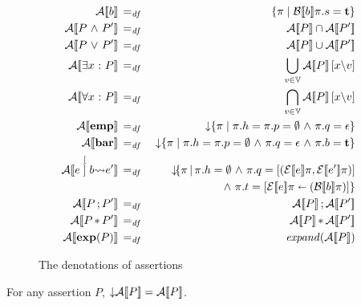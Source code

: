 \documentclass[11pt]{report}
\begin{document}
\begin{figure}[h]
	\centering
		\begin{eqnarray*}
			\dna{b} & \eqdef & \setof{\pi}{\dnbexpr{b}\pi.s = \bvt} \\
			\dna{P \conj P'} & \eqdef & \dna{P} \cap \dna{P'} \\
			\dna{P \disj P'} & \eqdef & \dna{P} \cup \dna{P'} \\
			\dna{\exists x \st P} & \eqdef & \bigcup_{v \in \setvalues}\dna{P}\unsubst{x}{v} \\
			\dna{\forall x \st P} & \eqdef & \bigcap_{v \in \setvalues}\dna{P}\unsubst{x}{v} \\
			\dna{\emp} & \eqdef & \down \setof{\pi}{\pi.h = \pi.p = \nil \conj \pi.q = \epsilon} \\
			\dna{\barr} & \eqdef & \down \setof{\pi}{\pi.h = \pi.p = \nil \conj \pi.q = \epsilon \conj \pi.b = \bvt} \\
			\dna{e \writeto{}{b} e'} & \eqdef & \down \lbrace\pi \,|\, \pi.h = \nil \conj \pi.q = \lsingle{(\dnexpr{e}\pi, \dnexpr{e'}\pi)} \\ 
			& & \mtab \mtab \conj \pi.t = \funup{}{\ptup{\dnexpr{e}\pi}{(\dnbexpr{b}\pi)}}\rbrace \\
			\dna{P \seq P'} & \eqdef & \dna{P} \seq \dna{P'} \\ 
			\dna{P \sep P'} & \eqdef & \dna{P} \sep \dna{P'} \\ 
			\dna{\expand{P}} & \eqdef & \sexpand{\dna{P}}
		\end{eqnarray*}
	\caption{The denotations of assertions}
	\label{fig:dna}
\end{figure} 

\begin{lemma}[Closure]
	\label{lem:assertion-closure}
	For any assertion $P$, $\operatorname{\downarrow}\!\mathcal{A}[\![P]\!] = \mathcal{A}[\![P]\!]$. 
\end{lemma}
\end{document}
